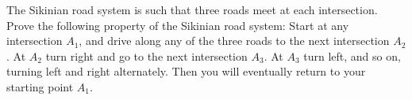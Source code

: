 The Sikinian road system is such that three roads meet at each intersection. Prove the following property of the Sikinian road system: Start at any intersection $A_1$, and drive along any of the three roads to the next intersection $A_2$. At $A_2$ turn right and go to the next intersection $A_3$. At $A_3$ turn left, and so on, turning left and right alternately. Then you will eventually return to your starting point $A_1$.
